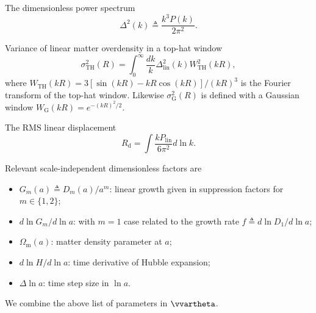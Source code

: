 \documentclass[usenatbib]{mnras}
\renewcommand{\d}{d}
\newcommand{\lna}{\ln\!a}
\newcommand{\lnk}{\ln\!k}
\newcommand{\Omegam}{\Omega_\mathrm{m}}
\newcommand{\linear}{\mathrm{lin}}
\newcommand{\tophat}{\mathrm{TH}}
\newcommand{\gauss}{\mathrm{G}}
\begin{document}
The dimensionless power spectrum
%
\begin{equation}
\Delta^2(k) \triangleq \frac{k^3 P(k)}{2 \pi^2}.
\end{equation}

Variance of linear matter overdensity in a top-hat window
%
\begin{equation}
\sigma_\tophat^2(R) = \int_0^\infty \frac{\d k}k
  \Delta_\linear^2(k) W_\tophat^2(kR),
\end{equation}
where $W_\tophat(kR) = 3[\sin(kR) - kR\cos(kR)] / (kR)^3$ is the
Fourier transform of the top-hat window.
Likewise $\sigma_\gauss^2(R)$ is defined with a Gaussian window
$W_\gauss(kR) = e^{-(kR)^2/2}$.

The RMS linear displacement
%
\begin{equation}
R_\mathrm{d} = \int \frac{k P_\linear}{6\pi^2} \d\lnk.
\end{equation}
%

Relevant scale-independent dimensionless factors are
\begin{itemize}
\item $G_m(a) \triangleq D_m(a) / a^m$: linear growth given in
  suppression factors for $m \in \{1, 2\}$;
\item $\d\ln G_m / \d\lna$: with $m=1$ case related to the growth rate
  $f \triangleq \d\ln D_1 / \d\lna$;
\item $\Omegam(a)$: matter density parameter at $a$;
\item $\d\ln\!H / \d\lna$: time derivative of Hubble expansion;
\item $\Delta\lna$: time step size in $\lna$.
\end{itemize}

We combine the above list of parameters in $\vvartheta$.
\end{document}
